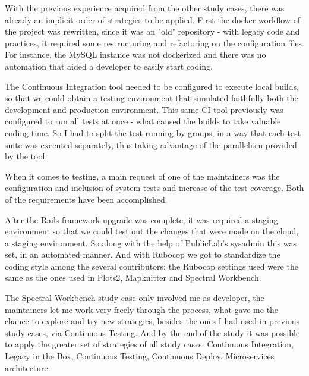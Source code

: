 \begin{table}[ht]
\caption{Spectral Workbench Comparative: Before DevOps and After DevOps.}
\label{table:spectral}
\end{table}

With the previous experience acquired from the other study cases, there was
already an implicit order of strategies to be applied. First the docker workflow
of the project was rewritten, since it was an "old" repository - with legacy
code and practices, it required some restructuring and refactoring on the
configuration files. For instance, the MySQL instance was not dockerized and
there was no automation that aided a developer to easily start coding. 

The Continuous Integration tool needed to be configured to execute local builds,
so that we could obtain a testing environment that simulated faithfully both the
development and production environment. This same CI tool previously was
configured to run all tests at once - what caused the builds to take valuable
coding time. So I had to split the test running by groups, in a way that each
test suite was executed separately, thus taking advantage of the parallelism
provided by the tool.

When it comes to testing, a main request of one of the maintainers was the
configuration and inclusion of system tests and increase of the test coverage.
Both of the requirements have been accomplished.

After the Rails framework upgrade was complete, it was required a staging
environment so that we could test out the changes that were made on the cloud, a
staging environment. So along with the help of PublicLab’s sysadmin this was
set, in an automated manner. And with Rubocop we got to standardize the coding
style among the several contributors; the Rubocop settings used were the same as
the ones used in Plots2, Mapknitter and Spectral Workbench.

The Spectral Workbench study case only involved me as developer, the maintainers
let me work very freely through the process, what gave me the chance to explore
and try new strategies, besides the ones I had used in previous study cases, via
Continuous Testing. And by the end of the study it was possible to apply the
greater set of strategies of all study cases: Continuous Integration, Legacy in
the Box,  Continuous Testing, Continuous Deploy, Microservices architecture.


